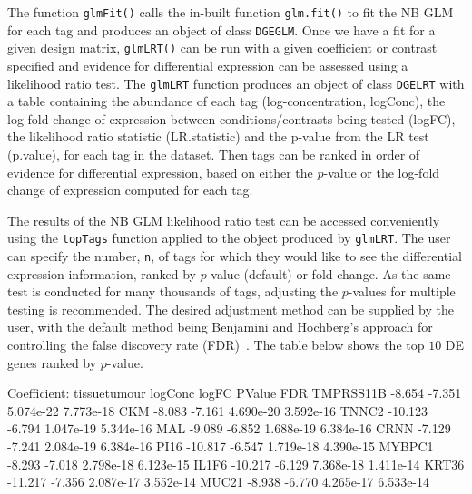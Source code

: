 The function \texttt{glmFit()} calls the in-built function
\texttt{glm.fit()} to fit the NB GLM for each tag and produces an
object of class \texttt{DGEGLM}. Once we have a fit for a given design
matrix, \texttt{glmLRT()} can be run with a given coefficient or
contrast specified and evidence for differential expression can be
assessed using a likelihood ratio test. The \texttt{glmLRT} function
produces an object of class \texttt{DGELRT} with a table containing
the abundance of each tag (log-concentration, logConc), the log-fold
change of expression between conditions/contrasts being tested
(logFC), the likelihood ratio statistic (LR.statistic) and the p-value
from the LR test (p.value), for each tag in the dataset. Then tags can
be ranked in order of evidence for differential expression, based on
either the $p$-value or the log-fold change of expression computed for
each tag.

The results of the NB GLM likelihood ratio test can be accessed
conveniently using the \texttt{topTags} function applied to the object
produced by \texttt{glmLRT}. The user can specify the number,
\texttt{n}, of tags for which they would like to see the differential
expression information, ranked by $p$-value (default) or fold
change. As the same test is conducted for many thousands of tags,
adjusting the $p$-values for multiple testing is recommended. The
desired adjustment method can be supplied by the user, with the
default method being Benjamini and Hochberg's approach for controlling
the false discovery rate (FDR)~\citep{Benjamini95}. The table below
shows the top $10$ DE genes ranked by $p$-value.

\begin{Schunk}
\begin{Soutput}
Coefficient: tissuetumour 
          logConc  logFC    PValue       FDR
TMPRSS11B  -8.654 -7.351 5.074e-22 7.773e-18
CKM        -8.083 -7.161 4.690e-20 3.592e-16
TNNC2     -10.123 -6.794 1.047e-19 5.344e-16
MAL        -9.089 -6.852 1.688e-19 6.384e-16
CRNN       -7.129 -7.241 2.084e-19 6.384e-16
PI16      -10.817 -6.547 1.719e-18 4.390e-15
MYBPC1     -8.293 -7.018 2.798e-18 6.123e-15
IL1F6     -10.217 -6.129 7.368e-18 1.411e-14
KRT36     -11.217 -7.356 2.087e-17 3.552e-14
MUC21      -8.938 -6.770 4.265e-17 6.533e-14
\end{Soutput}
\end{Schunk}

